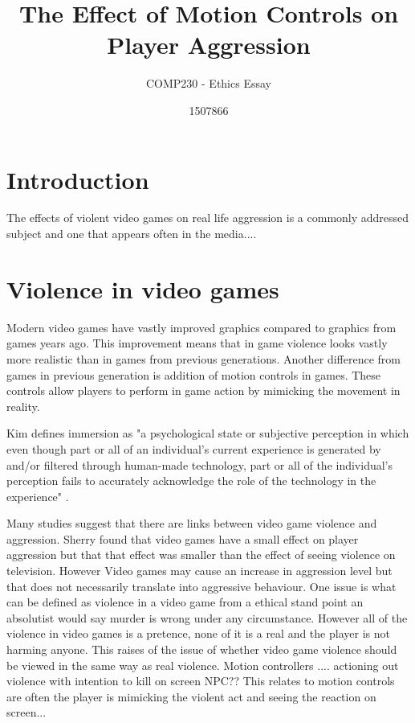 \documentclass{scrartcl}
\title{The Effect of Motion Controls on Player Aggression }
\subtitle{COMP230 - Ethics Essay}
\author{1507866}
\begin{document}
	
\maketitle
	
	
\section{Introduction}
The effects of violent video games on real life aggression is a commonly addressed subject and one that appears often in the media....


\section{Violence in video games}
 
Modern video games have vastly improved graphics compared to graphics from games years ago. \cite{Fumhe} This improvement means that in game violence looks vastly more realistic than in games from previous generations. Another difference from games in previous generation is addition of motion controls in games. These controls allow players to perform in game action by mimicking the movement in reality.

Kim defines immersion as "a psychological state or  subjective  perception  in which  even   though   part   or   all   of   an   individual’s   current   experience  is  generated  by  and/or  filtered  through  human-made  technology,  part  or  all  of  the  individual’s  perception  fails  to  accurately   acknowledge   the   role   of   the   technology   in   the   experience" \cite{Kim}.

\bigskip

Many studies suggest that there are links between video game violence and aggression. Sherry found that video games have a small effect on player aggression but that that effect was smaller than the effect of seeing violence on television. \cite{sherry2001effects} 
However 
\bigskip
Video games may cause an increase in aggression level but that does not necessarily translate into aggressive behaviour. \cite{Ferguson}
\bigskip
One issue is what can be defined as violence in a video game from a ethical stand point an absolutist would say murder is wrong under any circumstance. \cite{forsyth1980taxonomy} However all of the violence in video games is a pretence, none of it is a real and the player is not harming anyone. \cite{Tavinor} This raises of the issue of whether video game violence should be viewed in the same way as real violence. Motion controllers .... actioning out violence with intention to kill on screen NPC??
\bigskip
This relates to motion controls are often the player is mimicking the violent act and seeing the reaction on screen...
\end{document}
